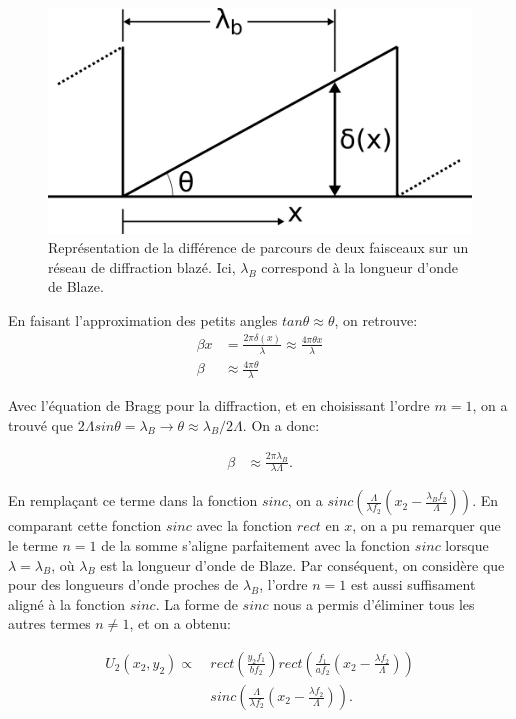 \documentclass[conference]{IEEEtran}
\begin{document}
\begin{figure}[H]
    \centering
    \includegraphics[scale=0.2]{beta.png}
    \caption{Représentation de la différence de parcours de deux faisceaux sur un réseau de diffraction
    blazé. Ici, $\lambda_B$ correspond à la longueur d'onde de Blaze. \label{beta}}
\end{figure}
En faisant l'approximation des petits angles $tan\theta\approx\theta$, on retrouve:
\begin{align*}
   \beta x &=\frac{2\pi\delta(x)}{\lambda} \approx\frac{4\pi\theta x}{\lambda}\\
   \beta&\approx \frac{4\pi\theta}{\lambda}
\end{align*} 

Avec l'équation de Bragg pour la diffraction, et en choisissant l'ordre $m=1$, on a trouvé que $2\Lambda sin\theta=\lambda_B \rightarrow \theta\approx\lambda_B/2\Lambda$.
On a donc:

\begin{align*}
   \beta&\approx \frac{2\pi\lambda_B}{\lambda\Lambda}.
\end{align*}

En remplaçant ce terme dans la fonction $sinc$, on a $sinc(\frac{\Lambda}{\lambda f_2}(x_2-\frac{\lambda_B f_2}{\Lambda}))$. En comparant cette
fonction $sinc$ avec la fonction $rect$ en $x$, on a pu remarquer que le terme $n=1$ de la somme s'aligne parfaitement 
avec la fonction $sinc$ lorsque $\lambda=\lambda_B$, où $\lambda_B$ est la longueur d'onde de Blaze. Par conséquent, on considère que pour des longueurs d'onde proches
de $\lambda_B$, l'ordre $n=1$ est aussi suffisament aligné à la fonction $sinc$. La forme de $sinc$ nous a permis d'éliminer tous les autres termes $n\neq1$, et on a obtenu:

\begin{align*}
    U_2(x_2,y_2)\propto&\ rect(\frac{y_2 f_1}{b f_2})rect(\frac{f_1}{a f_2}(x_2-\frac{\lambda f_2}{\Lambda}))\\
    & \ sinc(\frac{\Lambda}{\lambda f_2}(x_2-\frac{\lambda f_2}{\Lambda})).
\end{align*}
\end{document}
